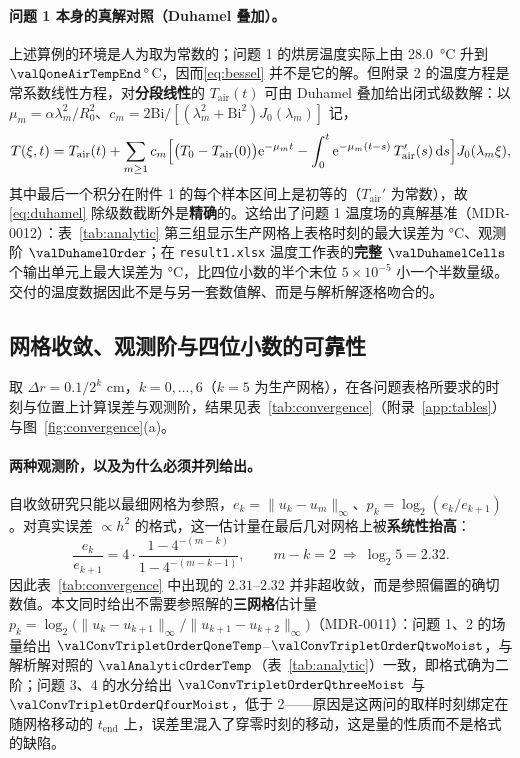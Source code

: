 \paragraph{问题 1 本身的真解对照（Duhamel 叠加）。} 上述算例的环境是人为取为常数的；问题 1 的烘房温度实际上由 \SI{28.0}{\celsius} 升到 $\valQoneAirTempEnd\,^\circ$C，因而\eqref{eq:bessel} 并不是它的解。但附录 2 的温度方程是常系数线性方程，对\textbf{分段线性}的 $T_{\mathrm{air}}(t)$ 可由 Duhamel 叠加给出闭式级数解：以 $\mu_m=\alpha\lambda_m^2/R_0^2$、$c_m=2\mathrm{Bi}/[(\lambda_m^2+\mathrm{Bi}^2)J_0(\lambda_m)]$ 记，
\begin{equation}
T(\xi,t)=T_{\mathrm{air}}(t)+\sum_{m\ge1}c_m\Bigl[\bigl(T_0-T_{\mathrm{air}}(0)\bigr)\mathrm e^{-\mu_mt}-\int_0^t\mathrm e^{-\mu_m(t-s)}\,T_{\mathrm{air}}'(s)\,\mathrm{d} s\Bigr]J_0(\lambda_m\xi),
\label{eq:duhamel}
\end{equation}
其中最后一个积分在附件 1 的每个样本区间上是初等的（$T_{\mathrm{air}}'$ 为常数），故\eqref{eq:duhamel} 除级数截断外是\textbf{精确}的。这给出了问题 1 温度场的真解基准（MDR-0012）：表~\ref{tab:analytic} 第三组显示生产网格上表格时刻的最大误差为 \sci{\valDuhamelErrTable} \si{\celsius}、观测阶 $\valDuhamelOrder$；在 \nolinkurl{result1.xlsx} 温度工作表的\textbf{完整} $\valDuhamelCells$ 个输出单元上最大误差为 \sci{\valDuhamelErrFull} \si{\celsius}，比四位小数的半个末位 $5\times10^{-5}$ 小一个半数量级。交付的温度数据因此不是与另一套数值解、而是与解析解逐格吻合的。

\subsection{网格收敛、观测阶与四位小数的可靠性}
\label{subsec:gridconv}

取 $\Delta r=0.1/2^k$ \si{\centi\meter}，$k=0,\dots,6$（$k=5$ 为生产网格），在各问题表格所要求的时刻与位置上计算误差与观测阶，结果见表~\ref{tab:convergence}（附录~\ref{app:tables}）与图~\ref{fig:convergence}(a)。

\paragraph{两种观测阶，以及为什么必须并列给出。} 自收敛研究只能以最细网格为参照，$e_k=\lVert u_k-u_m\rVert_\infty$、$p_k=\log_2(e_k/e_{k+1})$。对真实误差 $\propto h^2$ 的格式，这一估计量在最后几对网格上被\textbf{系统性抬高}：
\[\frac{e_k}{e_{k+1}}=4\cdot\frac{1-4^{-(m-k)}}{1-4^{-(m-k-1)}},\qquad m-k=2\ \Rightarrow\ \log_2 5=2.32 .\]
因此表~\ref{tab:convergence} 中出现的 $2.31$--$2.32$ 并非超收敛，而是参照偏置的确切数值。本文同时给出不需要参照解的\textbf{三网格}估计量 $p_k=\log_2\bigl(\lVert u_k-u_{k+1}\rVert_\infty/\lVert u_{k+1}-u_{k+2}\rVert_\infty\bigr)$（MDR-0011）：问题 1、2 的场量给出 $\valConvTripletOrderQoneTemp$--$\valConvTripletOrderQtwoMoist$，与解析解对照的 $\valAnalyticOrderTemp$（表~\ref{tab:analytic}）一致，即格式确为二阶；问题 3、4 的水分给出 $\valConvTripletOrderQthreeMoist$ 与 $\valConvTripletOrderQfourMoist$，低于 2——原因是这两问的取样时刻绑定在随网格移动的 $t_{\mathrm{end}}$ 上，误差里混入了穿零时刻的移动，这是量的性质而不是格式的缺陷。

